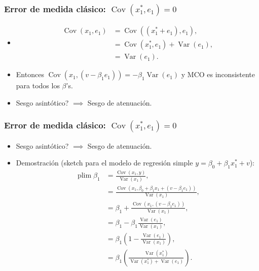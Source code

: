 \documentclass[t, compress, spanish, aspectratio=169]{beamer}
\newcommand{\compactmath}{\setlength{\abovedisplayskip}{3pt}\setlength{\belowdisplayskip}{3pt}\setlength{\abovedisplayshortskip}{0pt}\setlength{\belowdisplayshortskip}{2pt}\setlength{\jot}{1pt}} %
\DeclareMathOperator{\plim}{plim}
\DeclareMathOperator{\Var}{Var}
\DeclareMathOperator{\Cov}{Cov}
\begin{document}
\begin{frame}
    \frametitle{Error de medida cl\'asico: $\Cov(x_{1}^*,e_{1})=0$}
    \begin{itemize}  
            \item []
            \begin{align*}
                \Cov(x_{1}, e_{1}) &=\Cov((x_{1}^*+e_{1}), e_{1}),\\
                               &=\Cov(x_{1}^*,e_{1})+\Var(e_{1}),\\
                               &=\Var(e_{1}).
            \end{align*}
            \item Entonces $\Cov(x_{1}, (v-\beta_1 e_{1}))=-\beta_1 \Var(e_{1})$ y MCO es \alert{inconsistente} para todos los $\beta$'s.
            \item Sesgo asint\'otico? $\implies$ \alert{Sesgo de atenuaci\'on}.
\end{itemize}
\end{frame}

\begin{frame}\compactmath
	\frametitle{Error de medida cl\'asico: $\Cov(x_{1}^*,e_{1})=0$}
	\begin{itemize}  
		\item Sesgo asint\'otico? $\implies$ \alert{Sesgo de atenuaci\'on}.
		\footnotesize\compactmath
		\item [] Demostraci\'on (sketch para el modelo de regresi\'on simple $y=\beta_0+\beta_1 x_1^*+v$):
		\begin{align*}
		\plim \hat \beta_1 &= \frac{\Cov(x_1, y)}{\Var(x_1)},\\
		&= \frac{\Cov( x_1,\beta_0 + \beta_1 x_{1}+(v-\beta_1 e_{1}) )}{\Var( x_1)},\\
		&= \beta_1+\frac{\Cov(x_1,(v-\beta_1 e_{1}) )}{\Var(x_1)},\\
		&= \beta_1-\beta_1 \frac{\Var(e_{1})}{\Var(x_1)},\\
		&=\beta_1\left(1-\frac{\Var(e_{1})}{\Var(x_1)} \right),\\
		&=\beta_1\left(\frac{\Var(x_1^*)}{\Var(x_1^*)+\Var(e_{1})} \right).\\
		\end{align*}
	\end{itemize}
\end{frame}

\end{document}
